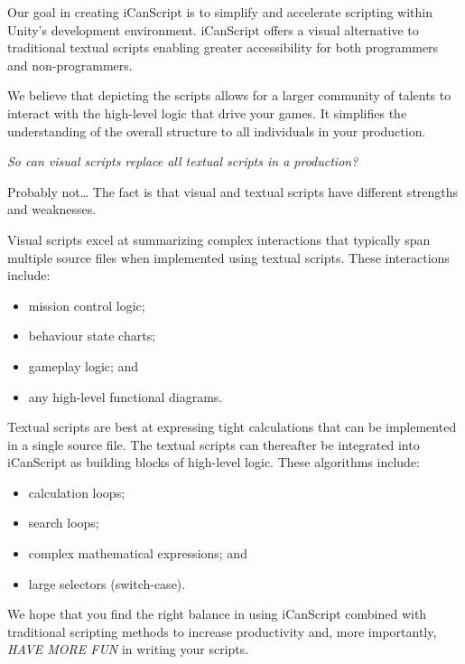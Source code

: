 Our goal in creating iCanScript is to simplify and accelerate scripting within Unity's development environment. iCanScript offers a visual alternative to traditional textual scripts enabling greater accessibility for both programmers and non-programmers.

We believe that depicting the scripts allows for a larger community of talents to interact with the high-level logic that drive your games. It simplifies the understanding of the overall structure to all individuals in your production.

\emph{So can visual scripts replace all textual scripts in a production?}

Probably not{\ldots} The fact is that visual and textual scripts have different strengths and weaknesses.

Visual scripts excel at summarizing complex interactions that typically span multiple source files when implemented using textual scripts. These interactions include:

\begin{itemize}
\item mission control logic;

\item behaviour state charts;

\item gameplay logic; and

\item any high-level functional diagrams.

\end{itemize}

Textual scripts are best at expressing tight calculations that can be implemented in a single source file. The textual scripts can thereafter be integrated into iCanScript as building blocks of high-level logic. These algorithms include:

\begin{itemize}
\item calculation loops;

\item search loops;

\item complex mathematical expressions; and

\item large selectors (switch-case).

\end{itemize}

We hope that you find the right balance in using iCanScript combined with traditional scripting methods to increase productivity and, more importantly, \emph{HAVE MORE FUN} in writing your scripts.

